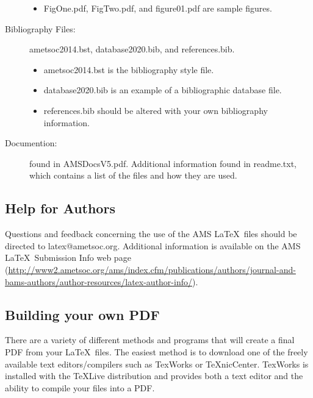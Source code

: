 \documentclass{ametsocV5}
\begin{document}
\begin{description}
\begin{itemize}
\item
FigOne.pdf, FigTwo.pdf, and figure01.pdf are sample figures.


\end{itemize}

\item[Bibliography Files:]

ametsoc2014.bst, database2020.bib, and references.bib.  

\begin{itemize}
\item
ametsoc2014.bst is the bibliography style file. 

\item
database2020.bib is an example of a bibliographic database file.

\item
references.bib should be altered with your own bibliography information.  
\end{itemize}



\item[Documention:] found in AMSDocsV5.pdf. Additional information
found in
readme.txt, which contains a list of the files and how they are used.

\end{description}

\subsection{Help for Authors}
Questions and feedback concerning the use of the AMS \LaTeX\ files should be
directed to latex@ametsoc.org. Additional information is available on the AMS
\LaTeX\ Submission Info web page (\url{http://www2.ametsoc.org/ams/index.cfm/publications/authors/journal-and-bams-authors/author-resources/latex-author-info/}).



\appendix[C]

\subsection{Building your own PDF}
There are a variety of different methods and programs that will create a
final PDF from your \LaTeX\ files. The easiest method is to download one of
the freely available text editors/compilers such as TexWorks or TeXnicCenter.
TexWorks is installed with the TeXLive distribution and provides both a text
editor and the ability to compile your files into a PDF.
\end{document}
